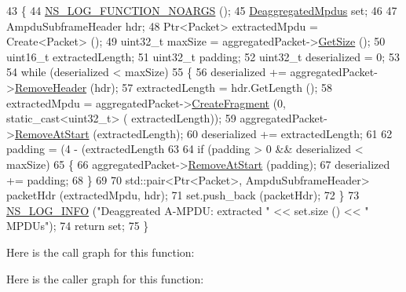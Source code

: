 \begin{DoxyCode}
43 \{
44   \hyperlink{log-macros-disabled_8h_a8f7e4afc291c9d29a65c18ac1f79197b}{NS\_LOG\_FUNCTION\_NOARGS} ();
45   \hyperlink{classns3_1_1MpduAggregator_a09f3b03cb988045c381fad4ba4dce371}{DeaggregatedMpdus} \textcolor{keyword}{set};
46 
47   AmpduSubframeHeader hdr;
48   Ptr<Packet> extractedMpdu = Create<Packet> ();
49   uint32\_t maxSize = aggregatedPacket->\hyperlink{classns3_1_1Packet_a462855c9929954d4301a4edfe55f4f1c}{GetSize} ();
50   uint16\_t extractedLength;
51   uint32\_t padding;
52   uint32\_t deserialized = 0;
53 
54   \textcolor{keywordflow}{while} (deserialized < maxSize)
55     \{
56       deserialized += aggregatedPacket->\hyperlink{classns3_1_1Packet_a0961eccf975d75f902d40956c93ba63e}{RemoveHeader} (hdr);
57       extractedLength = hdr.GetLength ();
58       extractedMpdu = aggregatedPacket->\hyperlink{classns3_1_1Packet_a16f6113606b355b2b346e2245fa2a3d0}{CreateFragment} (0, static\_cast<uint32\_t> (
      extractedLength));
59       aggregatedPacket->\hyperlink{classns3_1_1Packet_a78aa207e7921dd2f9f7e0d0b7a1c730a}{RemoveAtStart} (extractedLength);
60       deserialized += extractedLength;
61 
62       padding = (4 - (extractedLength %
63 
64       \textcolor{keywordflow}{if} (padding > 0 && deserialized < maxSize)
65         \{
66           aggregatedPacket->\hyperlink{classns3_1_1Packet_a78aa207e7921dd2f9f7e0d0b7a1c730a}{RemoveAtStart} (padding);
67           deserialized += padding;
68         \}
69 
70       std::pair<Ptr<Packet>, AmpduSubframeHeader> packetHdr (extractedMpdu, hdr);
71       \textcolor{keyword}{set}.push\_back (packetHdr);
72     \}
73   \hyperlink{group__logging_gafbd73ee2cf9f26b319f49086d8e860fb}{NS\_LOG\_INFO} (\textcolor{stringliteral}{"Deaggreated A-MPDU: extracted "} << \textcolor{keyword}{set}.size () << \textcolor{stringliteral}{" MPDUs"});
74   \textcolor{keywordflow}{return} \textcolor{keyword}{set};
75 \}
\end{DoxyCode}


Here is the call graph for this function\+:




Here is the caller graph for this function\+:


